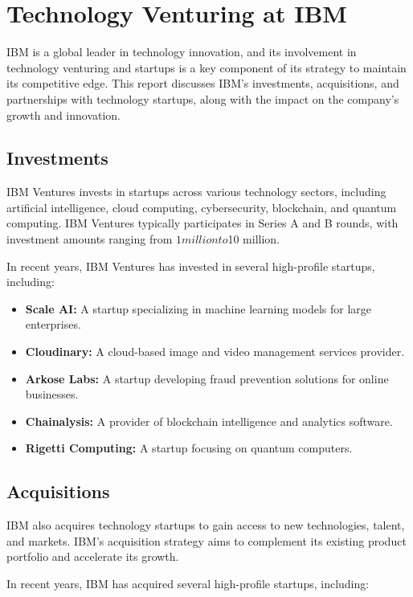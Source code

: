 \section{Technology Venturing at IBM}

IBM is a global leader in technology innovation, and its involvement in technology venturing and startups is a key component of its strategy to maintain its competitive edge. This report discusses IBM's investments, acquisitions, and partnerships with technology startups, along with the impact on the company's growth and innovation.

\subsection{Investments}

IBM Ventures invests in startups across various technology sectors, including artificial intelligence, cloud computing, cybersecurity, blockchain, and quantum computing. IBM Ventures typically participates in Series A and B rounds, with investment amounts ranging from $1 million to $10 million.

In recent years, IBM Ventures has invested in several high-profile startups, including:

\begin{itemize}
    \item \textbf{Scale AI:} A startup specializing in machine learning models for large enterprises.
    \item \textbf{Cloudinary:} A cloud-based image and video management services provider.
    \item \textbf{Arkose Labs:} A startup developing fraud prevention solutions for online businesses.
    \item \textbf{Chainalysis:} A provider of blockchain intelligence and analytics software.
    \item \textbf{Rigetti Computing:} A startup focusing on quantum computers.
\end{itemize}

\subsection{Acquisitions}

IBM also acquires technology startups to gain access to new technologies, talent, and markets. IBM's acquisition strategy aims to complement its existing product portfolio and accelerate its growth.

In recent years, IBM has acquired several high-profile startups, including:

